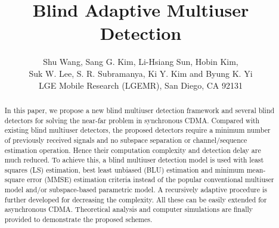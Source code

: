 \documentclass[a4paper,10pt,fleqn, twocolumn]{IEEETran}
\title{Blind Adaptive Multiuser Detection}
\author{Shu Wang, Sang G. Kim, Li-Hsiang Sun, Hobin Kim,\\
   Suk W. Lee, S. R. Subramanya, Ki Y. Kim and Byung K. Yi\\ LGE Mobile Research (LGEMR), San Diego, CA 92131}
\date{}
\begin{document}
\maketitle
\begin{abstract}\small
In this paper, we propose a new blind multiuser detection
framework and several blind detectors for solving the near-far
problem in synchronous CDMA. Compared with existing blind
multiuser detectors, the proposed detectors require a minimum
number of previously received signals and no subspace separation
or channel/sequence estimation operation. Hence their computation
complexity and detection delay are much reduced. To achieve this,
a blind multiuser detection model is used with least squares (LS)
estimation, best least unbiased (BLU) estimation and minimum
mean-square error (MMSE) estimation criteria instead of the
popular conventional multiuser model and/or subspace-based
parametric model. A recursively adaptive procedure is further
developed for decreasing the complexity. All these can be easily
extended for asynchronous CDMA. Theoretical analysis and computer
simulations are finally provided to demonstrate the proposed
schemes.
\end{abstract}
\end{document}

